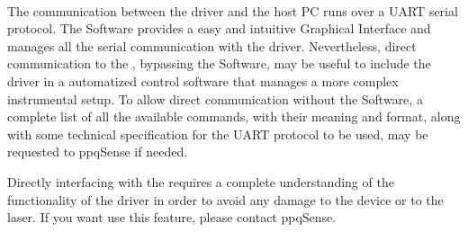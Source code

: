 \paragraph{} The communication between the \QubeModel  driver and the host PC runs over a UART serial protocol. The  \SoftwareType Software provides a easy and intuitive Graphical Interface and manages all the serial communication with the \QubeModel  driver.
\newline Nevertheless, direct communication to the \QubeModel , bypassing the  \SoftwareType Software, may be useful to include the driver in a automatized control software that manages a more complex instrumental setup.
\newline To allow direct communication without the  \SoftwareType Software, a complete list of all the available commands, with their meaning and format, along with some technical specification for the UART protocol to be used, may be requested to ppqSense if needed.

\begin{tcolorbox}[enhanced,attach boxed title to top center={yshift=-3mm,yshifttext=-1mm},
  colback=black!5!white,colframe=red!75!black,colbacktitle=red!80!black,
  title=CAUTION,fonttitle=\bfseries,
  boxed title style={size=small,colframe=black!50!black} ]
            Directly interfacing with the \QubeModel  requires a complete understanding of the functionality of the driver in order to avoid any damage to the device or to the laser.
            If you want use this feature, please contact ppqSense.
\end{tcolorbox}

\fi %